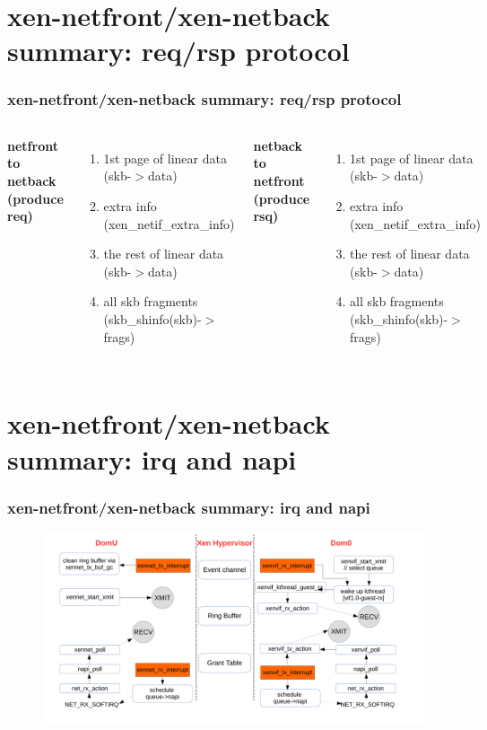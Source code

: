 \documentclass[aspectratio=169]{beamer}
\begin{document}
\section{xen-netfront/xen-netback summary: req/rsp protocol}
\begin{frame}
\frametitle{xen-netfront/xen-netback summary: req/rsp protocol}
\begin{columns}[c]
\begin{center} \textbf{netfront to netback (produce req)} \end{center}
\begin{enumerate}
\item 1st page of linear data (skb-$>$data)
\item extra info (xen\_netif\_extra\_info)
\item the rest of linear data (skb-$>$data)
\item all skb fragments (skb\_shinfo(skb)-$>$frags)
\end{enumerate}
\begin{center} \textbf{netback to netfront (produce rsq)} \end{center}
\begin{enumerate}
\item 1st page of linear data (skb-$>$data)
\item extra info (xen\_netif\_extra\_info)
\item the rest of linear data (skb-$>$data) 
\item all skb fragments (skb\_shinfo(skb)-$>$frags)
\end{enumerate}
\end{columns}
\end{frame}


\section{xen-netfront/xen-netback summary: irq and napi}
\begin{frame}
\frametitle{xen-netfront/xen-netback summary: irq and napi}
\begin{figure}
\includegraphics[width=1.0\linewidth]{figures/irq_napi.pdf}
\end{figure}
\end{frame}
\end{document}
